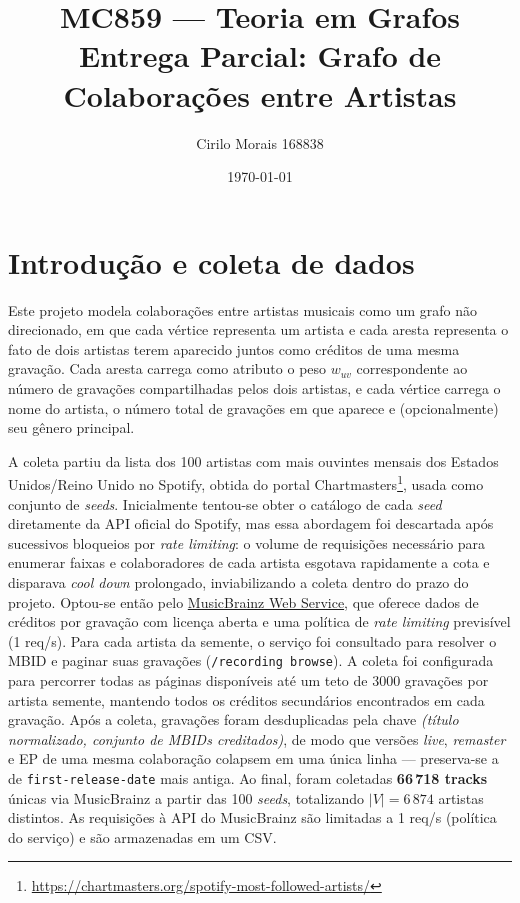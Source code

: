 \documentclass[11pt,a4paper]{article}
\title{MC859 --- Teoria em Grafos \\ \large Entrega Parcial: Grafo de Colaborações entre Artistas}
\author{Cirilo Morais 168838}
\date{\today}
\begin{document}
\maketitle

\section{Introdução e coleta de dados}

Este projeto modela colaborações entre artistas musicais como um grafo
não direcionado, em que cada vértice representa um artista e cada
aresta representa o fato de dois artistas terem aparecido juntos como
créditos de uma mesma gravação. Cada aresta carrega como atributo o
peso $w_{uv}$ correspondente ao número de gravações compartilhadas pelos
dois artistas, e cada vértice carrega o nome do artista, o número total
de gravações em que aparece e (opcionalmente) seu gênero principal.

A coleta partiu da lista dos 100 artistas com mais ouvintes mensais dos Estados Unidos/Reino Unido no
Spotify, obtida do portal Chartmasters\footnote{\url{https://chartmasters.org/spotify-most-followed-artists/}},
usada como conjunto de \emph{seeds}. Inicialmente tentou-se obter o
catálogo de cada \emph{seed} diretamente da API oficial do Spotify, mas
essa abordagem foi descartada após sucessivos bloqueios por
\emph{rate limiting}: o volume de requisições necessário para enumerar
faixas e colaboradores de cada artista esgotava rapidamente a cota e
disparava \emph{cool down} prolongado, inviabilizando a coleta dentro
do prazo do projeto. Optou-se então pelo
\href{https://musicbrainz.org/doc/MusicBrainz_API}{MusicBrainz Web Service},
que oferece dados de créditos por gravação com licença aberta e uma
política de \emph{rate limiting} previsível (1 req/s). Para cada artista da
semente, o serviço foi consultado para resolver o MBID e paginar suas
gravações
(\texttt{/recording browse}). A coleta foi configurada para percorrer
todas as páginas disponíveis até um teto de 3000 gravações por artista
semente, mantendo todos os créditos secundários encontrados em cada
gravação. Após a coleta, gravações foram desduplicadas pela chave
\emph{(título normalizado, conjunto de MBIDs creditados)}, de modo que
versões \emph{live}, \emph{remaster} e EP de uma mesma colaboração
colapsem em uma única linha --- preserva-se a de \texttt{first-release-date}
mais antiga. Ao final, foram coletadas \textbf{66\,718 tracks}
únicas via MusicBrainz a partir das 100 \emph{seeds}, totalizando
$|V|=6\,874$ artistas distintos. As requisições à API do MusicBrainz
são limitadas a 1 req/s (política do serviço) e são armazenadas em um CSV.
\end{document}
